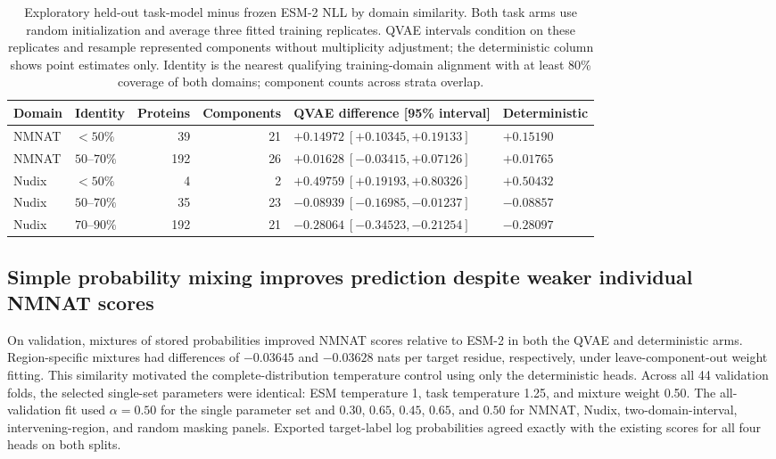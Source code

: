 \documentclass[referee,pdflatex,sn-vancouver-num]{sn-jnl}
\begin{document}
\begin{table}[ht]
\centering\small
\caption{Exploratory held-out task-model minus frozen ESM-2 NLL by domain similarity. Both task arms use random initialization and average three fitted training replicates. QVAE intervals condition on these replicates and resample represented components without multiplicity adjustment; the deterministic column shows point estimates only. Identity is the nearest qualifying training-domain alignment with at least 80\% coverage of both domains; component counts across strata overlap.}\label{tab:head_identity}
\setlength{\tabcolsep}{3pt}
\begin{tabular}{llrrll}
\toprule
Domain & Identity & Proteins & Components & QVAE difference [95\% interval] & Deterministic \\
\midrule
NMNAT & $<50\%$ & 39 & 21 & $+0.14972\ [ +0.10345,+0.19133]$ & $+0.15190$ \\
NMNAT & $50$--$70\%$ & 192 & 26 & $+0.01628\ [ -0.03415,+0.07126]$ & $+0.01765$ \\
Nudix & $<50\%$ & 4 & 2 & $+0.49759\ [ +0.19193,+0.80326]$ & $+0.50432$ \\
Nudix & $50$--$70\%$ & 35 & 23 & $-0.08939\ [ -0.16985,-0.01237]$ & $-0.08857$ \\
Nudix & $70$--$90\%$ & 192 & 21 & $-0.28064\ [ -0.34523,-0.21254]$ & $-0.28097$ \\
\bottomrule
\end{tabular}
\end{table}

\subsection{Simple probability mixing improves prediction despite weaker individual NMNAT scores}
On validation, mixtures of stored probabilities improved NMNAT scores relative to ESM-2 in both the QVAE and deterministic arms. Region-specific mixtures had differences of $-0.03645$ and $-0.03628$ nats per target residue, respectively, under leave-component-out weight fitting. This similarity motivated the complete-distribution temperature control using only the deterministic heads. Across all 44 validation folds, the selected single-set parameters were identical: ESM temperature 1, task temperature 1.25, and mixture weight 0.50. The all-validation fit used $\alpha=0.50$ for the single parameter set and $0.30$, $0.65$, $0.45$, $0.65$, and $0.50$ for NMNAT, Nudix, two-domain-interval, intervening-region, and random masking panels. Exported target-label log probabilities agreed exactly with the existing scores for all four heads on both splits.
\end{document}
